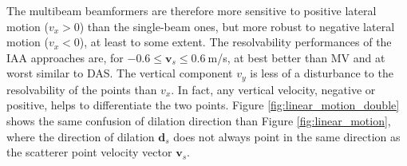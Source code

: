 The multibeam beamformers are therefore more sensitive to positive lateral motion ($v_x > 0$) than the single-beam ones, but more robust to negative lateral motion ($v_x < 0$), at least to some extent.
The resolvability performances of the IAA approaches are, for $-0.6 \leq \boldsymbol{v}_s \leq 0.6~$m/s, at best better than MV and at worst similar to DAS.
The vertical component $v_y$ is less of a disturbance to the resolvability of the points than $v_x$. In fact, any vertical velocity, negative or positive, helps to differentiate the two points.
Figure \ref{fig:linear_motion_double} shows the same confusion of dilation direction than Figure \ref{fig:linear_motion}, where the direction of dilation $\boldsymbol{d}_s$ does not always point in the same direction as the scatterer point velocity vector $\boldsymbol{v}_s$.

